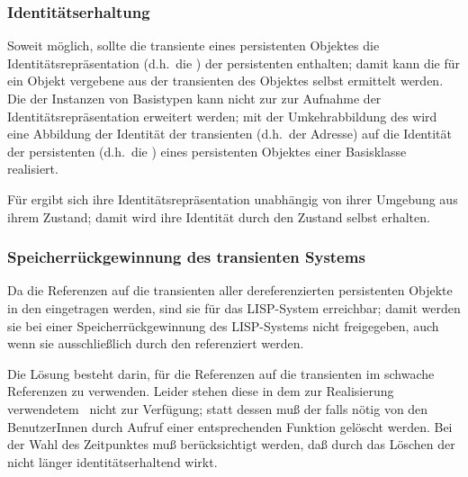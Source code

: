 \subsubsection{Identit\"{a}tserhaltung}
%
Soweit m\"{o}glich, sollte die transiente \representation{} eines
persistenten Objektes die Iden\-ti\-t\"{a}ts\-re\-pr\"{a}\-sen\-ta\-tion
(d.h.\ die \sobjid\/) der persistenten \representation{} enthalten;
damit kann  die f\"{u}r ein Objekt vergebene \sobjid\/ aus der
transienten \representationform{} des Objektes selbst ermittelt
werden. Die \representationform{} der Instanzen von Basistypen kann
nicht zur zur Aufnahme der Identit\"{a}tsrepr\"{a}sentation erweitert
werden;  mit der Umkehrabbildung des \cache\/ wird eine Abbildung der
Identit\"{a}t der transienten \representation{} (d.h.\ der Adresse) auf die
Identit\"{a}t der persistenten \representation{} (d.h.\ die \sobjid\/)
eines persistenten Objektes einer Basisklasse realisiert.
%
\par{}F\"{u}r \immval[s]\/ ergibt sich ihre Identit\"{a}tsrepr\"{a}sentation
un\-ab\-h\"{a}n\-gig von ihrer Umgebung aus ihrem Zustand; damit wird
ihre Identit\"{a}t durch den Zustand selbst erhalten.
%
\subsubsection{Speicherr\"{u}ckgewinnung des transienten Systems}
%
Da die Referenzen auf die transienten \representations{} aller
dereferenzierten persistenten Objekte in den \cache\/ eingetragen
werden, sind sie f\"{u}r das LISP-System erreichbar; damit werden sie bei
einer Speicherr\"{u}ckgewinnung des LISP-Systems nicht freigegeben, auch
wenn sie ausschlie\ss{}lich durch den \cache\/ referenziert werden.
%
\par{}Die L\"{o}sung besteht darin, f\"{u}r die Referenzen auf die
transienten \representations{} im \cache\/ schwache Referenzen zu
verwenden. Leider stehen diese in dem zur Realisierung verwendetem
\lwcl\ nicht zur Verf\"{u}gung; statt dessen mu\ss{} der \cache\/ falls
n\"{o}tig von den BenutzerInnen durch Aufruf einer entsprechenden
Funktion gel\"{o}scht werden. Bei der Wahl des Zeitpunktes mu\ss{}
ber\"{u}cksichtigt werden, da\ss{} durch das L\"{o}schen der \cache\/ nicht
l\"{a}nger identit\"{a}tserhaltend wirkt.
%
